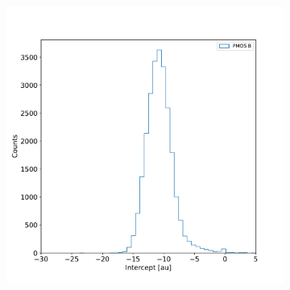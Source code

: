 \begin{figure}
\begin{subfigure}[b]{0.49\textwidth}
            \includegraphics[width=\linewidth]{figures/charaterization/intercept_histogram.pdf}
            \caption{}
            \label{fig:offset_histo}
        \end{subfigure}
        \hfill
        \begin{subfigure}[b]{0.49\textwidth}
            \centering

\end{subfigure}
\end{figure}

